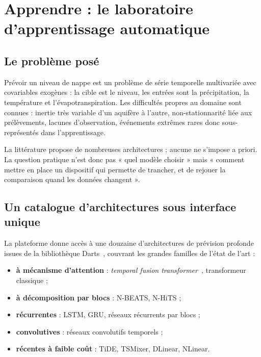 \chapter{Apprendre : le laboratoire d'apprentissage automatique}
\label{ch:apprentissage}


\section{Le problème posé}

Prévoir un niveau de nappe est un problème de série temporelle multivariée avec covariables
exogènes : la cible est le niveau, les entrées sont la précipitation, la température et
l'évapotranspiration. Les difficultés propres au domaine sont connues : inertie très variable
d'un aquifère à l'autre, non-stationnarité liée aux prélèvements, lacunes d'observation,
événements extrêmes rares donc sous-représentés dans l'apprentissage.

La littérature propose de nombreuses architectures ; aucune ne s'impose a priori. La question
pratique n'est donc pas « quel modèle choisir » mais « comment mettre en place un dispositif
qui permette de trancher, et de rejouer la comparaison quand les données changent ».

\section{Un catalogue d'architectures sous interface unique}

La plateforme donne accès à une douzaine d'architectures de prévision profonde issues de la
bibliothèque Darts~\cite{darts}, couvrant les grandes familles de l'état de l'art :

\begin{itemize}
  \item \textbf{à mécanisme d'attention} : \emph{temporal fusion transformer}~\cite{lim2021tft},
  transformeur classique ;
  \item \textbf{à décomposition par blocs} : N-BEATS, N-HiTS ;
  \item \textbf{récurrentes} : LSTM, GRU, réseaux récurrents par blocs ;
  \item \textbf{convolutives} : réseaux convolutifs temporels ;
  \item \textbf{récentes à faible coût} : TiDE, TSMixer, DLinear, NLinear.
\end{itemize}

